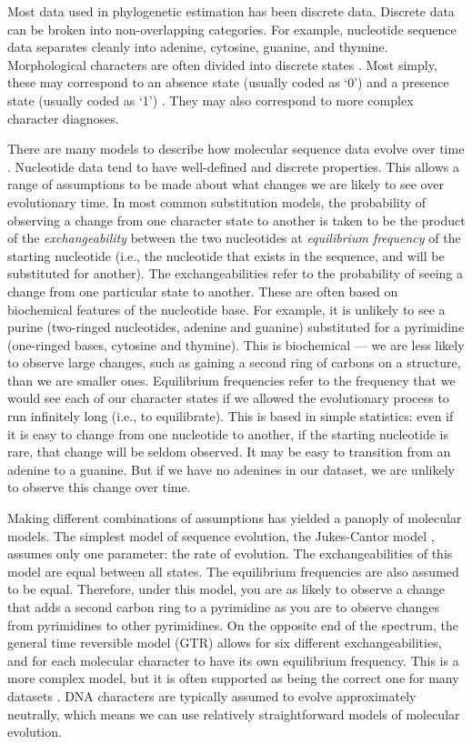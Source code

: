 Most data used in phylogenetic estimation has been discrete data.
Discrete data can be broken into non-overlapping categories.
For example, nucleotide sequence data separates cleanly into adenine, cytosine, guanine, and thymine.
Morphological characters are often divided into discrete states \citep{de1985ontogenetic}.
Most simply, these may correspond to an absence state (usually coded as `0') and a presence state (usually coded as `1') \citep{watrous1981}.
They may also correspond to more complex character diagnoses.

There are many models to describe how molecular sequence data evolve over time \citep{Jukes1969, Kimura1980, Felsenstein1981, Hasegawa1985, Tavare1986}.
Nucleotide data tend to have well-defined and discrete properties.
This allows a range of assumptions to be made about what changes we are likely to see over evolutionary time.
In most common substitution models, the probability of observing a change from one character state to another is taken to be the product of the \textit{exchangeability} between the two nucleotides at \textit{equilibrium frequency} of the starting nucleotide (i.e., the nucleotide that exists in the sequence, and will be substituted for another). 
The exchangeabilities refer to the probability of seeing a change from one particular state to another.
These are often based on biochemical features of the nucleotide base.
For example, it is unlikely to see a purine (two-ringed nucleotides, adenine and guanine) substituted for a pyrimidine (one-ringed bases, cytosine and thymine). 
This is biochemical --- we are less likely to observe large changes, such as gaining a second ring of carbons on a structure, than we are smaller ones.
Equilibrium frequencies refer to the frequency that we would see each of our character states if we allowed the evolutionary process to run infinitely long (i.e., to equilibrate).
This is based in simple statistics: even if it is easy to change from one nucleotide to another, if the starting nucleotide is rare, that change will be seldom observed.
It may be easy to transition from an adenine to a guanine.
But if we have no adenines in our dataset, we are unlikely to observe this change over time.

Making different combinations of assumptions has yielded a panoply of molecular models.
The simplest model of sequence evolution, the Jukes-Cantor model \citep{Jukes1969}, assumes only one parameter: the rate of evolution.
The exchangeabilities of this model are equal between all states. 
The equilibrium frequencies are also assumed to be equal.
Therefore, under this model, you are as likely to observe a change that adds a second carbon ring to a pyrimidine as you are to observe changes from pyrimidines to other pyrimidines.
On the opposite end of the spectrum, the general time reversible model (GTR) \citep{Tavare1986} allows for six different exchangeabilities, and for each molecular character to have its own equilibrium frequency.
This is a more complex model, but it is often supported as being the correct one for many datasets \citep{abadi2019}.
DNA characters are typically assumed to evolve approximately neutrally, which means we can use relatively straightforward models of molecular evolution.



